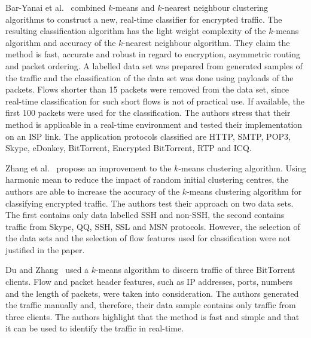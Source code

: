 Bar-Yanai et al.~\cite{BarYanai-2010-Realtime} combined $k$-means and $k$-nearest neighbour clustering algorithms to construct a new, real-time classifier for encrypted traffic. The resulting classification algorithm has the light weight complexity of the $k$-means algorithm and accuracy of the $k$-nearest neighbour algorithm. They claim the method is fast, accurate and robust in regard to encryption, asymmetric routing and packet ordering. A labelled data set was prepared from generated samples of the traffic and the classification of the data set was done using payloads of the packets. Flows shorter than 15 packets were removed from the data set, since real-time classification for such short flows is not of practical use. If available, the first 100 packets were used for the classification. The authors stress that their method is applicable in a real-time environment and tested their implementation on an ISP link. The application protocols classified are HTTP, SMTP, POP3, Skype, eDonkey, BitTorrent, Encrypted BitTorrent, RTP and ICQ.

Zhang et al.~\cite{Zhang-2013-Encrypted} propose an improvement to the $k$-means clustering algorithm. Using harmonic mean to reduce the impact of random initial clustering centres, the authors are able to increase the accuracy of the $k$-means clustering algorithm for classifying encrypted traffic. The authors test their approach on two data sets. The first contains only data labelled SSH and non-SSH, the second contains traffic from Skype, QQ, SSH, SSL and MSN protocols. However, the selection of the data sets and the selection of flow features used for classification were not justified in the paper.

Du and Zhang~\cite{Du-2013-Design} used a $k$-means algorithm to discern traffic of three BitTorrent clients. Flow and packet header features, such as IP addresses, ports, numbers and the length of packets, were taken into consideration. The authors generated the traffic manually and, therefore, their data sample contains only traffic from three clients. The authors highlight that the method is fast and simple and that it can be used to identify the traffic in real-time.

